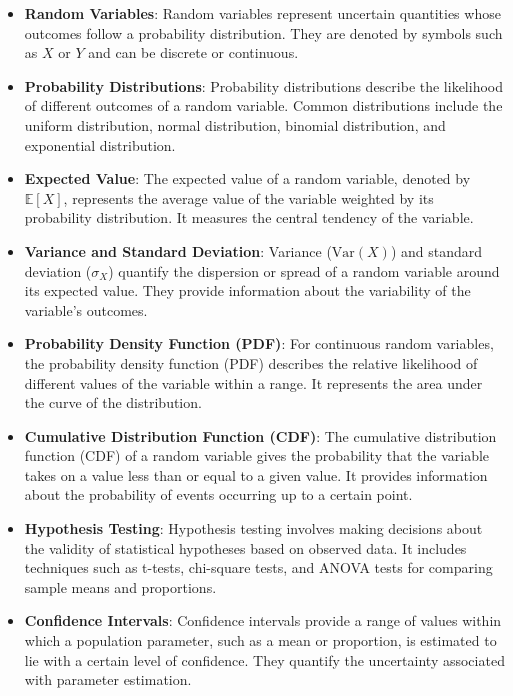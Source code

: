 \documentclass[12pt]{book} %
\begin{document}
\begin{itemize}
    \item \textbf{Random Variables}: Random variables represent uncertain quantities whose outcomes follow a probability distribution. They are denoted by symbols such as \(X\) or \(Y\) and can be discrete or continuous.
    
    \item \textbf{Probability Distributions}: Probability distributions describe the likelihood of different outcomes of a random variable. Common distributions include the uniform distribution, normal distribution, binomial distribution, and exponential distribution.
    
    \item \textbf{Expected Value}: The expected value of a random variable, denoted by \(\mathbb{E}[X]\), represents the average value of the variable weighted by its probability distribution. It measures the central tendency of the variable.
    
    \item \textbf{Variance and Standard Deviation}: Variance (\(\text{Var}(X)\)) and standard deviation (\(\sigma_X\)) quantify the dispersion or spread of a random variable around its expected value. They provide information about the variability of the variable's outcomes.
    
    \item \textbf{Probability Density Function (PDF)}: For continuous random variables, the probability density function (PDF) describes the relative likelihood of different values of the variable within a range. It represents the area under the curve of the distribution.
    
    \item \textbf{Cumulative Distribution Function (CDF)}: The cumulative distribution function (CDF) of a random variable gives the probability that the variable takes on a value less than or equal to a given value. It provides information about the probability of events occurring up to a certain point.
    
    \item \textbf{Hypothesis Testing}: Hypothesis testing involves making decisions about the validity of statistical hypotheses based on observed data. It includes techniques such as t-tests, chi-square tests, and ANOVA tests for comparing sample means and proportions.
    
    \item \textbf{Confidence Intervals}: Confidence intervals provide a range of values within which a population parameter, such as a mean or proportion, is estimated to lie with a certain level of confidence. They quantify the uncertainty associated with parameter estimation.
\end{itemize}
\end{document}
